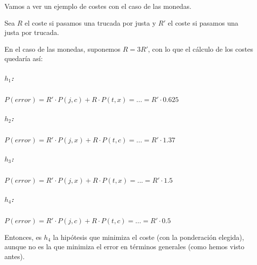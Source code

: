 \documentclass{apuntes}
\begin{document}
 \begin{example}
Vamos a ver un ejemplo de costes con el caso de las monedas. 

Sea $R$ el coste si pasamos una trucada por justa y $R'$ el coste si pasamos una justa por trucada.

En el caso de las monedas, suponemos $R = 3R'$, con lo que el cálculo de los costes quedaría así:


\subparagraph{$h_1$:} $P(error) = R' · P(j,c) + R · P(t,x) = ... = R' · 0.625$
\subparagraph{$h_2$:} $P(error) = R' · P(j,x) + R · P(t,c) = ... = R' · 1.37$
\subparagraph{$h_3$:} $P(error) = R' · P(j,x) + R · P(t,x) = ... = R' · 1.5$
\subparagraph{$h_4$:} $P(error) = R' · P(j,c) + R · P(t,c) = ... = R' · 0.5$

Entonces, es $h_4$ la hipótesis que minimiza el coste (con la ponderación elegida), aunque no es la que minimiza el error en términos generales (como hemos visto antes).

 \end{example}
\end{document}

